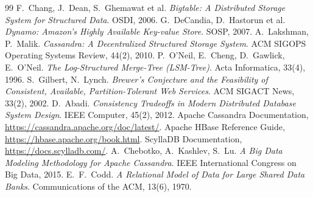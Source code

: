 \documentclass[11pt,a4paper]{article}
\begin{document}
\begin{thebibliography}{99}
 F.~Chang, J.~Dean, S.~Ghemawat et al. \emph{Bigtable: A Distributed Storage System for Structured Data}. OSDI, 2006.
 G.~DeCandia, D.~Hastorun et al. \emph{Dynamo: Amazon's Highly Available Key-value Store}. SOSP, 2007.
 A.~Lakshman, P.~Malik. \emph{Cassandra: A Decentralized Structured Storage System}. ACM SIGOPS Operating Systems Review, 44(2), 2010.
 P.~O'Neil, E.~Cheng, D.~Gawlick, E.~O'Neil. \emph{The Log-Structured Merge-Tree (LSM-Tree)}. Acta Informatica, 33(4), 1996.
 S.~Gilbert, N.~Lynch. \emph{Brewer's Conjecture and the Feasibility of Consistent, Available, Partition-Tolerant Web Services}. ACM SIGACT News, 33(2), 2002.
 D.~Abadi. \emph{Consistency Tradeoffs in Modern Distributed Database System Design}. IEEE Computer, 45(2), 2012.
 Apache Cassandra Documentation, \url{https://cassandra.apache.org/doc/latest/}.
 Apache HBase Reference Guide, \url{https://hbase.apache.org/book.html}.
 ScyllaDB Documentation, \url{https://docs.scylladb.com/}.
 A.~Chebotko, A.~Kashlev, S.~Lu. \emph{A Big Data Modeling Methodology for Apache Cassandra}. IEEE International Congress on Big Data, 2015.
 E.~F.~Codd. \emph{A Relational Model of Data for Large Shared Data Banks}. Communications of the ACM, 13(6), 1970.
\end{thebibliography}
\end{document}
